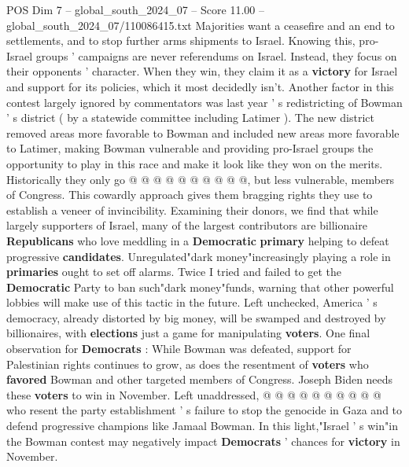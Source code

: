 \begin{textsample}{POS Dim 7 – global\_south\_2024\_07 – Score 11.00 – global\_south\_2024\_07/110086415.txt}
Majorities want a ceasefire and an end to settlements, and to stop further arms shipments to Israel.
Knowing this, pro-Israel groups ' campaigns are never referendums on Israel.
Instead, they focus on their opponents ' character.
When they win, they claim it as a \textbf{victory} for Israel and support for its policies, which it most decidedly isn't.
Another factor in this contest largely ignored by commentators was last year ' s redistricting of Bowman ' s district ( by a statewide committee including Latimer ).
The new district removed areas more favorable to Bowman and included new areas more favorable to Latimer, making Bowman vulnerable and providing pro-Israel groups the opportunity to play in this race and make it look like they won on the merits.
Historically they only go @ @ @ @ @ @ @ @ @ @, but less vulnerable, members of Congress.
This cowardly approach gives them bragging rights they use to establish a veneer of invincibility.
Examining their donors, we find that while largely supporters of Israel, many of the largest contributors are billionaire \textbf{Republicans} who love meddling in a \textbf{Democratic} \textbf{primary} helping to defeat progressive \textbf{candidates}.
Unregulated"dark money"increasingly playing a role in \textbf{primaries} ought to set off alarms.
Twice I tried and failed to get the \textbf{Democratic} Party to ban such"dark money"funds, warning that other powerful lobbies will make use of this tactic in the future.
Left unchecked, America ' s democracy, already distorted by big money, will be swamped and destroyed by billionaires, with \textbf{elections} just a game for manipulating \textbf{voters}.
One final observation for \textbf{Democrats} : While Bowman was defeated, support for Palestinian rights continues to grow, as does the resentment of \textbf{voters} who \textbf{favored} Bowman and other targeted members of Congress.
Joseph Biden needs these \textbf{voters} to win in November.
Left unaddressed, @ @ @ @ @ @ @ @ @ @ who resent the party establishment ' s failure to stop the genocide in Gaza and to defend progressive champions like Jamaal Bowman.
In this light,"Israel ' s win"in the Bowman contest may negatively impact \textbf{Democrats} ' chances for \textbf{victory} in November.

\end{textsample}
